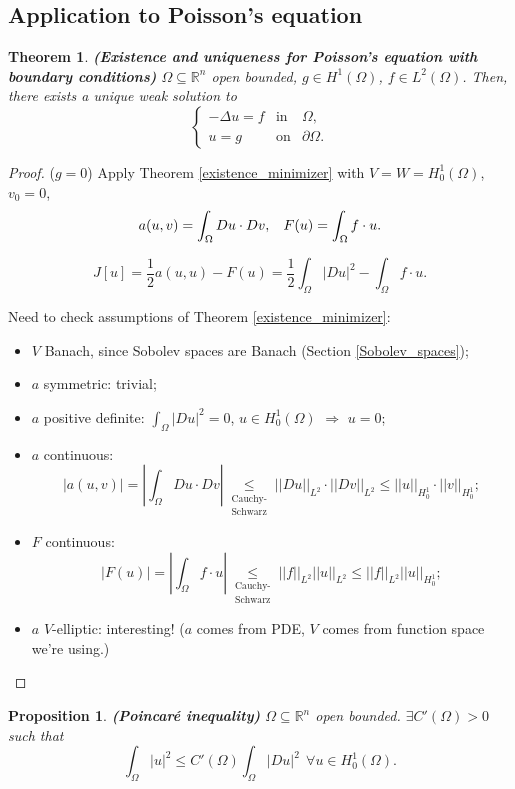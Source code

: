 \documentclass[12pt]{article}
\newtheorem{proposition}{Proposition}[section]
\newtheorem{theorem}{Theorem}[section]
\theoremstyle{definition}
\begin{document}
\subsection{Application to Poisson's equation}
\begin{theorem}\label{Poisson_Sobolev}
\emph{\textbf{(Existence and uniqueness for Poisson's equation with boundary conditions)}} $\Omega\subseteq\mathbb R^n$ open bounded, $g\in H^1(\Omega)$, $f\in L^2(\Omega)$. Then, there exists a unique weak solution to
\[\left\{\begin{array}{rcl}-\Delta u=f&\text{in}&\Omega,\\u=g&\text{on}&\partial\Omega.\end{array}\right.\]
\end{theorem}

\begin{proof}
($g=0$) Apply Theorem \ref{existence_minimizer} with $V=W=H_0^1(\Omega)$, $v_0=0$,
\[a(u,v)=\int_\Omega Du\cdot Dv,\hspace{3mm}F(u)=\int_\Omega f\cdot u.\]

\[J[u]=\frac12a(u,u)-F(u)=\frac12\int_\Omega|Du|^2-\int_\Omega f\cdot u.\]

Need to check assumptions of Theorem \ref{existence_minimizer}:
\begin{itemize}
\item $V$ Banach, since Sobolev spaces are Banach (Section \ref{Sobolev_spaces});
\item $a$ symmetric: trivial;
\item $a$ positive definite: $\int_\Omega|Du|^2=0$, $u\in H_0^1(\Omega)$ $\Rightarrow$ $u=0$;
\item $a$ continuous:
\[\big|a(u,v)\big|=\left|\int_\Omega Du\cdot Dv\right|\underset{\substack{\text{Cauchy-}\\\text{Schwarz}}}\leq||Du||_{L^2}\cdot||Dv||_{L^2}\leq||u||_{H_0^1}\cdot||v||_{H_0^1};\]
\item $F$ continuous:
\[|F(u)|=\left|\int_\Omega f\cdot u\right|\underset{\substack{\text{Cauchy-}\\\text{Schwarz}}}\leq||f||_{L^2}||u||_{L^2}\leq||f||_{L^2}||u||_{H_0^1};\]
\item $a$ $V$-elliptic: interesting! ($a$ comes from PDE, $V$ comes from function space we're using.)
\end{itemize}
\end{proof}

\begin{proposition}
\emph{\textbf{(Poincar\'e inequality)}} $\Omega\subseteq\mathbb R^n$ open bounded. $\exists C'(\Omega)>0$ such that
\[\int_\Omega|u|^2\leq C'(\Omega)\int_\Omega|Du|^2\ \ \forall u\in H_0^1(\Omega).\]
\end{proposition}
\end{document}
